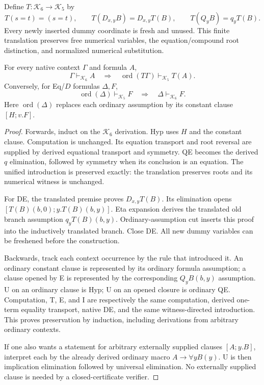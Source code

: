 Define $T:\mathcal K_6\to\mathcal K_5$ by
\[
 T(s=t)=(s=t),\qquad
 T(D_{x,y}B)=D_{x,y}T(B),\qquad
 T(Q_yB)=q_yT(B).
\]
Every newly inserted dummy coordinate is fresh and unused. This finite
translation preserves free numerical variables, the equation/compound
root distinction, and normalized numerical substitution.

\begin{theorem}
For every native context $\Gamma$ and formula $A$,
\[
 \Gamma\vdash_{\mathcal K_6} A
 \quad\Longrightarrow\quad
 \operatorname{ord}(T\Gamma)\vdash_{\mathcal K_5}T(A).
\]
Conversely, for Eq/$D$ formulas $\Delta,F$,
\[
 \operatorname{ord}(\Delta)\vdash_{\mathcal K_5}F
 \quad\Longrightarrow\quad
 \Delta\vdash_{\mathcal K_6}F.
\]
Here $\operatorname{ord}(\Delta)$ replaces each ordinary assumption by its
constant clause $[H;v.F]$.
\end{theorem}
\begin{proof}
Forwards, induct on the $\mathcal K_6$ derivation. Hyp uses $H$ and the
constant clause. Computation is unchanged. Its equation transport and
root reversal are supplied by derived equational transport and symmetry.
QE becomes the derived $q$ elimination, followed by symmetry when its
conclusion is an equation. The unified introduction is preserved exactly:
the translation preserves roots and its numerical witness is unchanged.

For DE, the translated premise proves $D_{x,y}T(B)$. Its elimination
opens $[T(B)(b,0);y.T(B)(b,y)]$. Eta expansion derives the translated old
branch assumption $q_yT(B)(b,y)$. Ordinary-assumption cut inserts this
proof into the inductively translated branch. Close DE. All new dummy
variables can be freshened before the construction.

Backwards, track each context occurrence by the rule that introduced it.
An ordinary constant clause is represented by its ordinary formula
assumption; a clause opened by E is represented by the corresponding
$Q_yB(b,y)$ assumption. U on an ordinary clause is Hyp; U on an opened
closure is ordinary QE. Computation, T, E, and I are respectively the
same computation, derived one-term equality transport, native DE, and
the same witness-directed introduction. This proves preservation by
induction, including derivations from arbitrary ordinary contexts.

If one also wants a statement for arbitrary externally supplied clauses
$[A;y.B]$, interpret each by the already derived ordinary macro
$A\to\forall yB(y)$. U is then implication elimination followed by
universal elimination. No externally supplied clause is needed by a
closed-certificate verifier.
\end{proof}

